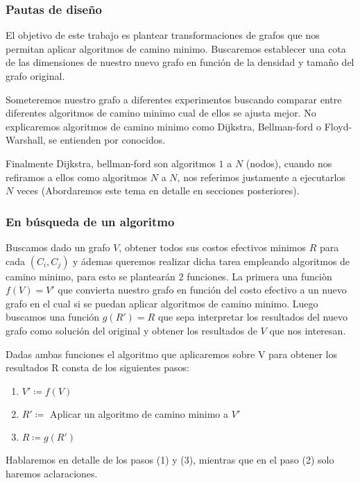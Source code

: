 \documentclass[12pt]{article}
\def\is{\coloneqq}
\begin{document}
\subsubsection{Pautas de diseño}

El objetivo de este trabajo es plantear transformaciones de grafos que nos permitan aplicar algoritmos de camino minimo. Buscaremos establecer una cota de las dimensiones de nuestro nuevo grafo en función de la densidad y tamaño del grafo original.

Someteremos nuestro grafo a diferentes experimentos buscando comparar entre diferentes algoritmos de camino minimo cual de ellos se ajusta mejor. No explicaremos algoritmos de camino minimo como Dijkstra, Bellman-ford o Floyd-Warshall, se entienden por conocidos.

Finalmente Dijkstra, bellman-ford son algoritmos $1$ a $N$ (nodos), cuando nos refiramos a ellos como algoritmos $N$ a $N$, nos referimos justamente a ejecutarlos $N$ veces (Abordaremos este tema en detalle en secciones posteriores).

\subsubsection{En búsqueda de un algoritmo}

Buscamos dado un grafo $V$, obtener todos sus costos efectivos minimos $R$ para cada $(C_i, C_j)$ y ádemas queremos realizar dicha tarea empleando algoritmos de camino minimo, para esto se plantearán 2 funciones. La primera una funciòn $f(V) = V'$ que convierta nuestro grafo en función del costo efectivo a un nuevo grafo en el cual si se puedan aplicar algoritmos de camino minimo. Luego buscamos una función $g(R') = R$ que sepa interpretar los resultados del nuevo grafo como solución del original y obtener los resultados de $V$ que nos interesan.

Dadas ambas funciones el algoritmo que aplicaremos sobre V para obtener los resultados R consta de los siguientes pasos:

\begin{enumerate}
	\item $V' \is f(V)$
	\item $R' \is$ Aplicar un algoritmo de camino minimo a $V'$
	\item $R \is g(R')$
\end{enumerate}

Hablaremos en detalle de los pasos (1) y (3), mientras que en el paso (2) solo haremos aclaraciones.
\end{document}
